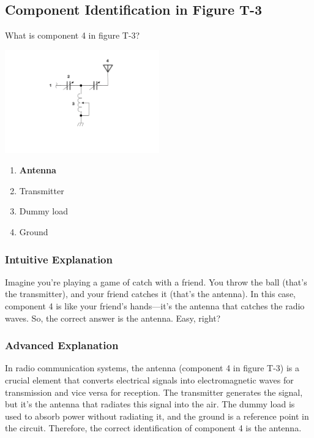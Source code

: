 \subsection{Component Identification in Figure T-3}
\label{T6C11}

\begin{tcolorbox}[colback=gray!10!white,colframe=black!75!black,title=T6C11]
What is component 4 in figure T-3?

\includegraphics[width=0.5\textwidth]{tech/images/t3.png} 

\begin{enumerate}[label=\Alph*)]
    \item \textbf{Antenna}
    \item Transmitter
    \item Dummy load
    \item Ground
\end{enumerate}
\end{tcolorbox}

\subsubsection{Intuitive Explanation}
Imagine you’re playing a game of catch with a friend. You throw the ball (that’s the transmitter), and your friend catches it (that’s the antenna). In this case, component 4 is like your friend’s hands—it’s the antenna that catches the radio waves. So, the correct answer is the antenna. Easy, right?

\subsubsection{Advanced Explanation}
In radio communication systems, the antenna (component 4 in figure T-3) is a crucial element that converts electrical signals into electromagnetic waves for transmission and vice versa for reception. The transmitter generates the signal, but it’s the antenna that radiates this signal into the air. The dummy load is used to absorb power without radiating it, and the ground is a reference point in the circuit. Therefore, the correct identification of component 4 is the antenna.

